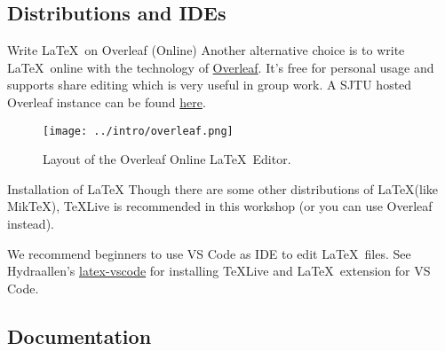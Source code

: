 \subsection{Distributions and IDEs}

\begin{frame}{Write \LaTeX\ on Overleaf (Online)}
    Another alternative choice is to write \LaTeX\ online with the technology of \href{https://www.overleaf.com/}{Overleaf}.
    It's free for personal usage and supports share editing which is very useful in group work.
    A SJTU hosted Overleaf instance can be found \href{https://latex.sjtu.edu.cn/}{here}.
    \begin{figure}
        \centering
        \texttt{[image: ../intro/overleaf.png]}
        \caption{Layout of the Overleaf Online \LaTeX\ Editor.}
    \end{figure}
\end{frame}


\begin{frame}{Installation of \LaTeX}
    Though there are some other distributions of \LaTeX (like Mik\TeX), \TeX Live is recommended in this workshop (or you can use Overleaf instead).

    We recommend beginners to use VS Code as IDE to edit \LaTeX\  files.
    See Hydraallen's \href{https://github.com/Hydraallen/Latex-vscode}{latex-vscode} for installing \TeX Live and \LaTeX\  extension for VS Code.
\end{frame}

\subsection{Documentation}

